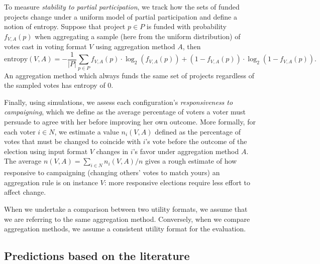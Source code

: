 \documentclass[mnsc,blindrev]{informs3_freeuse} %
\newcommand{\kibitz}[2]{\ifnum\Comments=1{\color{#1}{#2}}\fi}
\newcommand{\rf}[1]{\kibitz{blue}{[Roy says:#1]}}
\newcommand{\gb}[1]{\kibitz{red}{[GB:#1]}}
\begin{document}
To measure \emph{stability to partial participation}, we track how the sets of funded projects change under a uniform model of partial participation and define a notion of entropy. 
Suppose that project $p\in P$ is funded with probability $f_{V,A}(p)$ when aggregating  a sample (here from the uniform distribution) of votes cast in voting format $V$ using aggregation method $A$, then 
\[
\text{entropy}(V,A) = -\frac{1}{|P|}\sum_{p\in P} f_{V,A}(p) \cdot \log_2(f_{V,A}(p)) + (1 - f_{V,A}(p)) \cdot \log_2(1 - f_{V,A}(p)).
\]
An aggregation method which always funds the same set of projects regardless of the sampled votes has entropy of 0. 

Finally, using simulations, we assess each configuration's \emph{responsiveness to campaigning}, which we define as the average percentage of voters a voter must persuade to agree with her before improving her own outcome.
More formally, for each voter $i\in N$, we estimate a value $n_i(V, A)$ defined as the percentage  of votes that must be changed to coincide with $i$'s vote before the outcome of the election using input format $V$ changes in $i$'s favor under aggregation method $A$.   The average   $n(V,A) = \sum_{i\in N} n_i(V, A) /n$ gives a rough estimate of how responsive to campaigning (changing others' votes to match yours) an aggregation rule is  on   instance $V$: more responsive elections require  less effort  to affect change.


When we undertake a comparison between two utility formats, we assume that we are referring to the same aggregation method. Conversely, when we compare aggregation methods, we assume a consistent utility format for the evaluation.

\subsection{Predictions based on the literature}\label{sec:pred}
\end{document}
